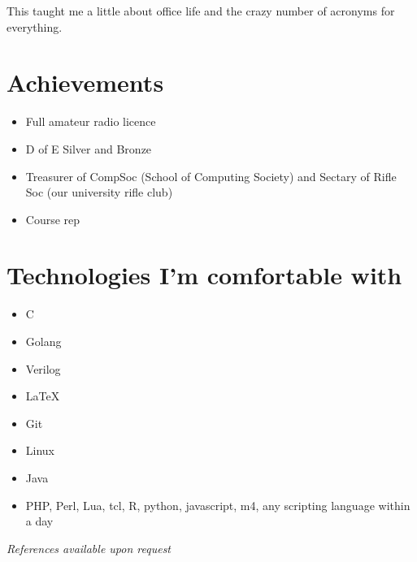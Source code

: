 \documentclass[9pt,a4paper]{article}
\begin{document}
\begin{multicols*}{2}
This taught me a little about office life and the crazy number of acronyms for everything.

\section*{Achievements}
\begin{itemize}
	\item Full amateur radio licence

	\item D of E Silver and Bronze

  \item Treasurer of CompSoc (School of Computing Society) and Sectary of Rifle Soc (our university rifle club)

	\item Course rep
\end{itemize}


\section*{Technologies I'm comfortable with}
\begin{multicols*}{2}
\begin{itemize}
\item C
\item Golang
\item Verilog
\item \LaTeX 
\item Git
\item Linux
\item Java
\item PHP, Perl, Lua, tcl, R, python, javascript, m4, any scripting language within a day
\end{itemize}
\end{multicols*}
\vfill
\textit{References available upon request}
\end{multicols*}
\end{document}
